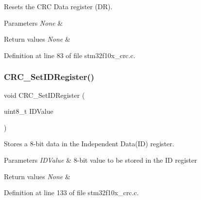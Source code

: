 Resets the C\+RC Data register (DR). 


\begin{DoxyParams}{Parameters}
{\em None} & \\
\hline
\end{DoxyParams}

\begin{DoxyRetVals}{Return values}
{\em None} & \\
\hline
\end{DoxyRetVals}


Definition at line 83 of file stm32f10x\+\_\+crc.\+c.

\mbox{\label{group___c_r_c___private___functions_ga769c9a42be57b972ae61bbada0f2e46a}} 
\subsubsection{\texorpdfstring{C\+R\+C\+\_\+\+Set\+I\+D\+Register()}{CRC\_SetIDRegister()}}
{\footnotesize\ttfamily void C\+R\+C\+\_\+\+Set\+I\+D\+Register (\begin{DoxyParamCaption}\item[{uint8\+\_\+t}]{I\+D\+Value }\end{DoxyParamCaption})}



Stores a 8-\/bit data in the Independent Data(\+I\+D) register. 


\begin{DoxyParams}{Parameters}
{\em I\+D\+Value} & 8-\/bit value to be stored in the ID register \\
\hline
\end{DoxyParams}

\begin{DoxyRetVals}{Return values}
{\em None} & \\
\hline
\end{DoxyRetVals}


Definition at line 133 of file stm32f10x\+\_\+crc.\+c.

